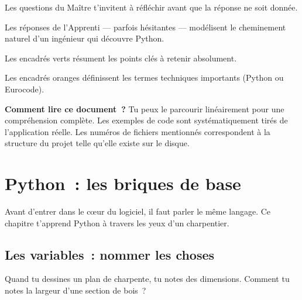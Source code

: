 \documentclass[12pt, a4paper, openany]{book}
\begin{document}
\begin{maitre}
Les questions du Ma\^itre t'invitent \`a r\'efl\'echir avant que la r\'eponse
ne soit donn\'ee.
\end{maitre}

\begin{apprenti}
Les r\'eponses de l'Apprenti --- parfois h\'esitantes --- mod\'elisent
le cheminement naturel d'un ing\'enieur qui d\'ecouvre Python.
\end{apprenti}

\begin{important}
Les encadr\'es verts r\'esument les points cl\'es \`a retenir absolument.
\end{important}

\begin{definition}
Les encadr\'es oranges d\'efinissent les termes techniques importants
(Python ou Eurocode).
\end{definition}

\textbf{Comment lire ce document~?}
Tu peux le parcourir lin\'eairement pour une compr\'ehension compl\`ete.
Les exemples de code sont syst\'ematiquement tir\'es de l'application r\'eelle.
Les num\'eros de fichiers mentionn\'es correspondent \`a la structure du projet telle
qu'elle existe sur le disque.

\chapter{Python~: les briques de base}

Avant d'entrer dans le c\oe{}ur du logiciel, il faut parler le m\^eme
langage. Ce chapitre t'apprend Python \`a travers les yeux d'un charpentier.

\section{Les variables~: nommer les choses}

\begin{maitre}
Quand tu dessines un plan de charpente, tu notes des dimensions.
Comment tu notes la largeur d'une section de bois~?
\end{maitre}
\end{document}
